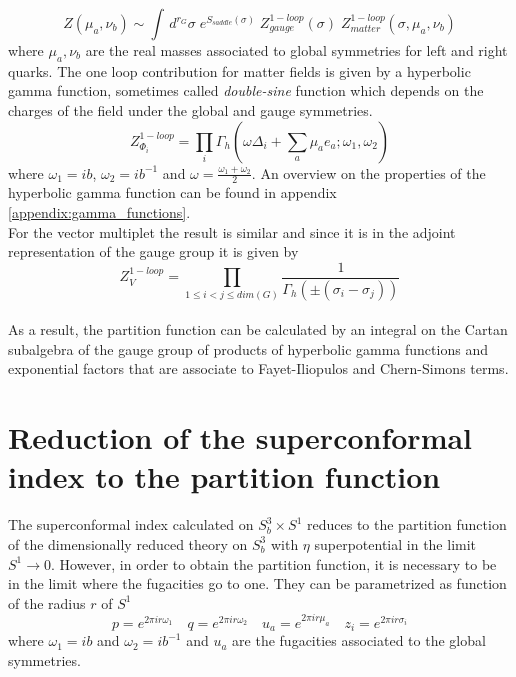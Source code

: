 \begin{equation}
 Z (\mu_a , \nu_b) \sim \int \, d^{r_G} \sigma \; e^{S_{saddle}(\sigma)} \; Z_{gauge}^{1-loop}(\sigma ) \; Z_{matter}^{1-loop}(\sigma,\mu_a,\nu_b)
\end{equation}
where $\mu_a,\nu_b$ are the real masses associated to global symmetries for left and right quarks. 
The one loop contribution for matter fields is given by a hyperbolic gamma function, sometimes called \emph{double-sine} function \cite{Hama:2011ea} which depends on the charges of the field under the global and gauge symmetries.
\begin{equation}
Z_{\Phi_i}^{1-loop} = \prod_{i}\Gamma_h ( \omega \Delta_i + \sum_{a} \mu_a e_a ; \omega_1 ,\omega_2)
\end{equation}
where $\omega_1 = i b  $, $\omega_2 =  i b^{-1}$ and $\omega =\frac{\omega_1 + \omega_2}{2}$.
An overview on the properties of the hyperbolic gamma function can be found in appendix \ref{appendix:gamma_functions}.\\
For the vector multiplet the result is similar and since it is in the adjoint representation of the gauge group it is given by
\begin{equation}
Z_{V}^{1-loop} = \prod_{1 \leq i < j \leq dim(G)} \frac{1}{\Gamma_h( \pm (\sigma_i - \sigma_j) )}
\end{equation}
\\
As a result, the partition function can be calculated by an integral on the Cartan subalgebra of the gauge group of products of hyperbolic gamma functions and exponential factors that are associate to Fayet-Iliopulos and Chern-Simons terms. 


\section{Reduction of the superconformal index to the partition function}

The superconformal index calculated on $S_b^3 \times S^1$ reduces to the partition function of the dimensionally reduced theory on $S_b^3$ with $\eta$ superpotential in the limit $S^1 \rightarrow 0$.
However, in order to obtain the partition function, it is necessary to be in the limit where the fugacities go to one. 
They can be parametrized as function of the radius $r$ of $S^1$
\begin{equation}
p= e^{2 \pi i r \omega_1} \quad q=e^{2 \pi i r \omega_2} \quad u_a = e^{2 \pi i r \mu_a } \quad z_i = e^{2 \pi i r \sigma_i}
\end{equation}
where $\omega_1 = i b  $ and $\omega_2 =  i b^{-1}$ and $u_a$ are the fugacities associated to the global symmetries.\\









